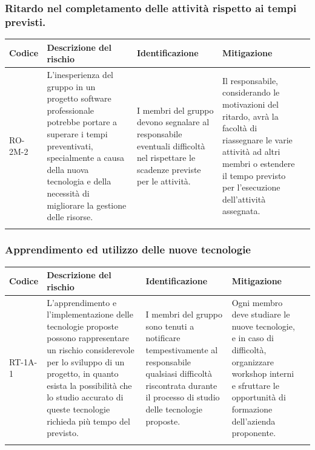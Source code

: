\documentclass{article}
\begin{document}
\subsubsection{Ritardo nel completamento delle attività rispetto ai tempi previsti.}
\begin{table}[h]
    \centering
    \begin{tabularx}{\textwidth}{l>{\RaggedRight}X>{\RaggedRight}X>{\RaggedRight}X>{\RaggedRight}X}
    \toprule
    \rowcolor{gray!50}
    \textbf{Codice} & \textbf{Descrizione del rischio} & \textbf{Identificazione} & \textbf{Mitigazione} \\
    \midrule
    \addlinespace 
    RO-2M-2 & 
    L'inesperienza del gruppo in un progetto software professionale potrebbe portare a superare i tempi preventivati, specialmente a causa della nuova tecnologia e della necessità di migliorare la gestione delle risorse.& 
    I membri del gruppo devono segnalare al responsabile eventuali difficoltà nel rispettare le scadenze previste per le attività. &
    Il responsabile, considerando le motivazioni del ritardo, avrà la facoltà di riassegnare le varie attività ad altri membri o estendere il tempo previsto per l'esecuzione dell'attività assegnata. \\
    \bottomrule
    \addlinespace 
    \end{tabularx}
\end{table}

\subsubsection{Apprendimento ed utilizzo delle nuove tecnologie}
\begin{table}[h]
    \centering
    \begin{tabularx}{\textwidth}{l>{\RaggedRight}X>{\RaggedRight}X>{\RaggedRight}X>{\RaggedRight}X}
    \toprule
    \rowcolor{gray!50}
    \textbf{Codice} & \textbf{Descrizione del rischio} & \textbf{Identificazione} & \textbf{Mitigazione} \\
    \midrule
    \addlinespace 
    RT-1A-1 & 
    L’apprendimento e l'implementazione delle tecnologie proposte possono rappresentare un rischio considerevole per lo  sviluppo di un progetto, in quanto esista la possibilità che lo studio accurato di queste tecnologie richieda più tempo del previsto.& 
    I membri del gruppo sono tenuti a notificare tempestivamente al responsabile qualsiasi difficoltà riscontrata durante il processo di studio delle tecnologie proposte. &
    Ogni membro deve studiare le nuove tecnologie, e in caso di difficoltà, organizzare workshop interni e sfruttare le opportunità di formazione dell'azienda proponente. \\
    \bottomrule
    \addlinespace 
    \end{tabularx}
\end{table}
\end{document}
